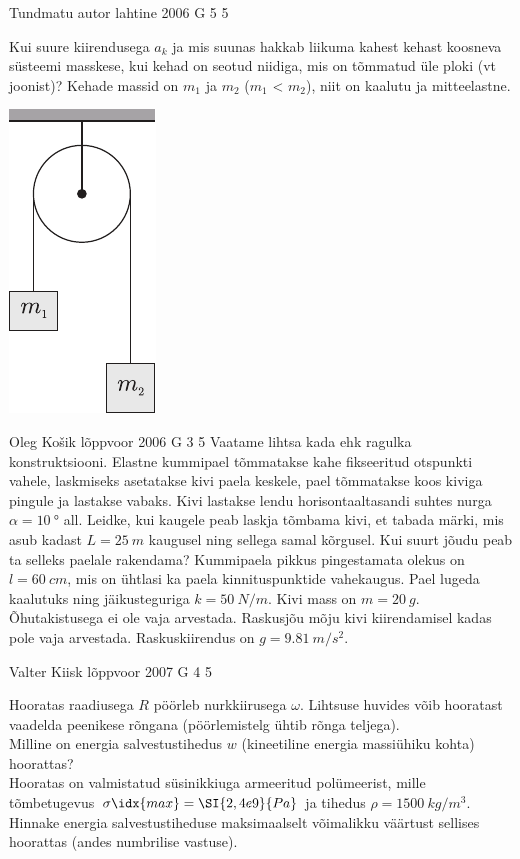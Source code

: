 \documentclass[11pt]{article}
\begin{document}
{%
{Tundmatu autor} %
{lahtine} %
{2006} %
{G 5} %
{5} %
{
\ifStatement
Kui suure kiirendusega $a_k$ ja mis suunas hakkab liikuma kahest kehast koosneva süsteemi masskese, kui kehad on seotud niidiga, mis on tõmmatud üle ploki (vt joonist)? Kehade massid on $m_1$ ja $m_2$ ($m_1$ < $m_2$), niit on kaalutu ja mitteelastne.
\begin{center}
	\includegraphics[width=0.25\linewidth]{2006-lahg-05-yl}
\end{center}
\fi
}

{Oleg Košik} %
{lõppvoor} %
{2006} %
{G 3} %
{5} %
{
\ifStatement
Vaatame lihtsa kada ehk ragulka konstruktsiooni. Elastne kummipael tõmmatakse kahe fikseeritud otspunkti vahele, laskmiseks asetatakse kivi paela keskele, pael tõmmatakse koos kiviga pingule ja lastakse vabaks. Kivi lastakse lendu horisontaaltasandi suhtes nurga $\alpha = \SI{10}{\degree}$ all. Leidke, kui kaugele peab laskja tõmbama kivi, et tabada märki, mis asub kadast $L = \SI{25}{m}$ kaugusel ning sellega samal kõrgusel. Kui suurt jõudu peab ta selleks paelale rakendama? Kummipaela pikkus pingestamata olekus on $l = \SI{60}{cm}$, mis on ühtlasi ka paela kinnituspunktide vahekaugus. Pael lugeda kaalutuks ning jäikusteguriga $k = \SI{50}{N/m}$. Kivi mass on $m = \SI{20}{g}$. Õhutakistusega ei ole vaja arvestada. Raskusjõu mõju kivi kiirendamisel kadas pole vaja arvestada. Raskuskiirendus on $g = \SI{9.81}{m/s^2}$.
\fi
}

{Valter Kiisk} %
{lõppvoor} %
{2007} %
{G 4} %
{5} %
{
\ifStatement
Hooratas raadiusega $R$ pöörleb nurkkiirusega $\omega$. Lihtsuse huvides võib hooratast vaadelda peenikese rõngana (pöörlemistelg ühtib rõnga teljega).\\
\osa Milline on energia salvestustihedus $w$ (kineetiline energia massiühiku kohta) hoorattas?\\
\osa Hooratas on valmistatud süsinikkiuga armeeritud polümeerist, mille tõmbetugevus $\sigma\idx{max} = \SI{2,4e9}{Pa}$ ja tihedus $\rho = \SI{1500}{kg/m^3}$. Hinnake energia salvestustiheduse maksimaalselt võimalikku väärtust sellises hoorattas (andes numbrilise vastuse).

}}
\end{document}
